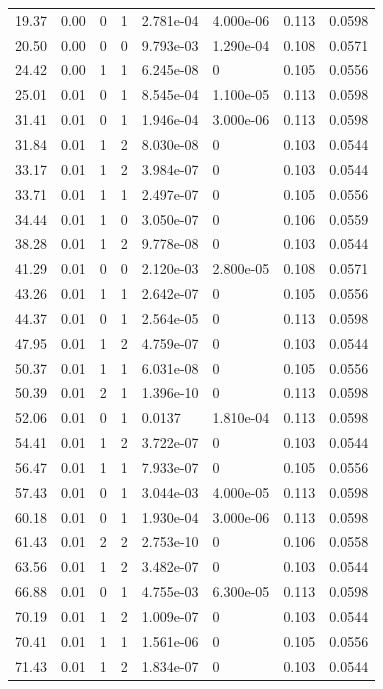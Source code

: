 \documentclass[preview]{standalone}
\begin{document}
{{\begin{tabular}{L{1.2cm}C{1.2cm} C{0.3cm}C{0.5cm} C{1.4cm}C{1.4cm} C{1.4cm}C{1.4cm}}
  19.37  &  0.00  & 0     &  1 &  2.781e-04  & 4.000e-06  & 0.113 &  0.0598   \\ 
  20.50  &  0.00  & 0     &  0 &  9.793e-03  & 1.290e-04  & 0.108 &  0.0571   \\ 
  24.42  &  0.00  & 1     &  1 &  6.245e-08  & 0  & 0.105 &  0.0556   \\ 
  25.01  &  0.01  & 0     &  1 &  8.545e-04  & 1.100e-05  & 0.113 &  0.0598   \\ 
  31.41  &  0.01  & 0     &  1 &  1.946e-04  & 3.000e-06  & 0.113 &  0.0598   \\ 
  31.84  &  0.01  & 1     &  2 &  8.030e-08  & 0  & 0.103 &  0.0544   \\ 
  33.17  &  0.01  & 1     &  2 &  3.984e-07  & 0  & 0.103 &  0.0544   \\ 
  33.71  &  0.01  & 1     &  1 &  2.497e-07  & 0  & 0.105 &  0.0556   \\ 
  34.44  &  0.01  & 1     &  0 &  3.050e-07  & 0  & 0.106 &  0.0559   \\ 
  38.28  &  0.01  & 1     &  2 &  9.778e-08  & 0  & 0.103 &  0.0544   \\ 
  41.29  &  0.01  & 0     &  0 &  2.120e-03  & 2.800e-05  & 0.108 &  0.0571   \\ 
  43.26  &  0.01  & 1     &  1 &  2.642e-07  & 0  & 0.105 &  0.0556   \\ 
  44.37  &  0.01  & 0     &  1 &  2.564e-05  & 0  & 0.113 &  0.0598   \\ 
  47.95  &  0.01  & 1     &  2 &  4.759e-07  & 0  & 0.103 &  0.0544   \\ 
  50.37  &  0.01  & 1     &  1 &  6.031e-08  & 0  & 0.105 &  0.0556   \\ 
  50.39  &  0.01  & 2     &  1 &  1.396e-10  & 0  & 0.113 &  0.0598   \\ 
  52.06  &  0.01  & 0     &  1 &  0.0137  & 1.810e-04  & 0.113 &  0.0598   \\ 
  54.41  &  0.01  & 1     &  2 &  3.722e-07  & 0  & 0.103 &  0.0544   \\ 
  56.47  &  0.01  & 1     &  1 &  7.933e-07  & 0  & 0.105 &  0.0556   \\ 
  57.43  &  0.01  & 0     &  1 &  3.044e-03  & 4.000e-05  & 0.113 &  0.0598   \\ 
  60.18  &  0.01  & 0     &  1 &  1.930e-04  & 3.000e-06  & 0.113 &  0.0598   \\ 
  61.43  &  0.01  & 2     &  2 &  2.753e-10  & 0  & 0.106 &  0.0558   \\ 
  63.56  &  0.01  & 1     &  2 &  3.482e-07  & 0  & 0.103 &  0.0544   \\ 
  66.88  &  0.01  & 0     &  1 &  4.755e-03  & 6.300e-05  & 0.113 &  0.0598   \\ 
  70.19  &  0.01  & 1     &  2 &  1.009e-07  & 0  & 0.103 &  0.0544   \\ 
  70.41  &  0.01  & 1     &  1 &  1.561e-06  & 0  & 0.105 &  0.0556   \\ 
  71.43  &  0.01  & 1     &  2 &  1.834e-07  & 0  & 0.103 &  0.0544   \\ 
\hline 
\end{tabular} 

}}
\end{document}
